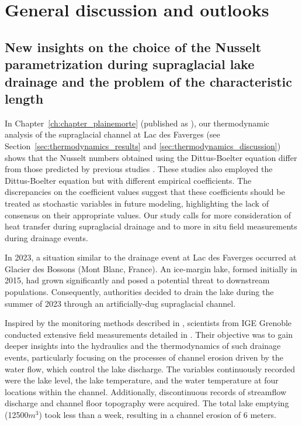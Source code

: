 \chapter{General discussion and outlooks}
\label{ch:discussion}

\section{New insights on the choice of the Nusselt parametrization during supraglacial lake drainage and the problem of the characteristic length}

In Chapter~\ref{ch:chapter_plainemorte} (published as \cite{Ogier&al2021}), our thermodynamic analysis of the supraglacial channel at Lac des Faverges (see Section~\ref{sec:thermodynamics_results} and \ref{sec:thermodynamics_discussion}) shows that the Nusselt numbers obtained using the Dittus-Boelter equation differ from those predicted by previous studies \cite{Lunardini&al1986, Clarke2003, Vincent&al2010}. These studies also employed the Dittus-Boelter equation but with different empirical coefficients. The discrepancies on the coefficient values suggest that these coefficients should be treated as stochastic variables in future modeling, highlighting the lack of consensus on their appropriate values. Our study calls for more consideration of heat transfer during supraglacial drainage and to more in situ field measurements during drainage events.

In 2023, a situation similar to the drainage event at Lac des Faverges occurred at Glacier des Bossons (Mont Blanc, France). An ice-margin lake, formed initially in 2015, had grown significantly and posed a potential threat to downstream populations. Consequently, authorities decided to drain the lake during the summer of 2023 through an artificially-dug supraglacial channel. 

Inspired by the monitoring methods described in \cite{Ogier&al2021}, scientists from IGE Grenoble conducted extensive field measurements detailed in \cite{Gagliardini&al2024}. Their objective was to gain deeper insights into the hydraulics and the thermodynamics of such drainage events, particularly focusing on the processes of channel erosion driven by the water flow, which control the lake discharge. The variables continuously recorded were the lake level, the lake temperature, and the water temperature at four locations within the channel. Additionally, discontinuous records of streamflow discharge and channel floor topography were acquired. The total lake emptying (12500$m^3$) took less than a week, resulting in a channel erosion of 6 meters.


